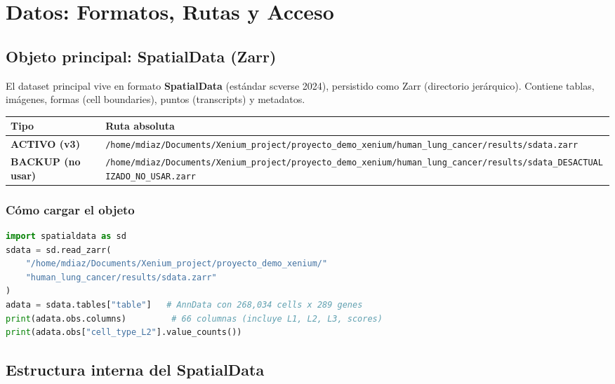 \documentclass[11pt,a4paper]{article}
\begin{document}
\newpage
\section{Datos: Formatos, Rutas y Acceso}

\subsection{Objeto principal: SpatialData (Zarr)}

El dataset principal vive en formato \textbf{SpatialData} (estándar scverse 2024), persistido como Zarr (directorio jerárquico). Contiene tablas, imágenes, formas (cell boundaries), puntos (transcripts) y metadatos.

\begin{center}
\begin{tabularx}{\textwidth}{|l|X|}
\hline
\rowcolor{lightgray}\textbf{Tipo} & \textbf{Ruta absoluta} \\
\hline
\textbf{ACTIVO (v3)} & \texttt{\small /home/mdiaz/Documents/Xenium\_project/proyecto\_demo\_xenium/human\_lung\_cancer/results/sdata.zarr} \\
\hline
\textcolor{morange}{\textbf{BACKUP (no usar)}} & \texttt{\small /home/mdiaz/Documents/Xenium\_project/proyecto\_demo\_xenium/human\_lung\_cancer/results/sdata\_DESACTUALIZADO\_NO\_USAR.zarr} \\
\hline
\end{tabularx}
\end{center}

\subsubsection{Cómo cargar el objeto}

\begin{lstlisting}[language=Python]
import spatialdata as sd
sdata = sd.read_zarr(
    "/home/mdiaz/Documents/Xenium_project/proyecto_demo_xenium/"
    "human_lung_cancer/results/sdata.zarr"
)
adata = sdata.tables["table"]   # AnnData con 268,034 cells x 289 genes
print(adata.obs.columns)         # 66 columnas (incluye L1, L2, L3, scores)
print(adata.obs["cell_type_L2"].value_counts())
\end{lstlisting}

\subsection{Estructura interna del SpatialData}
\end{document}
